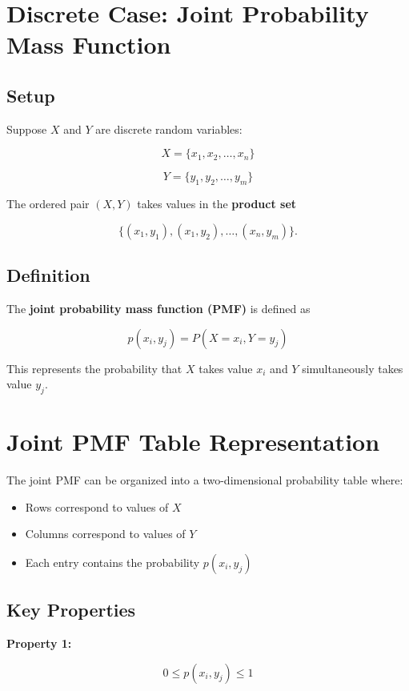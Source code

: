 \documentclass[12pt]{article}
\begin{document}
\section{Discrete Case: Joint Probability Mass Function}

\subsection{Setup}

Suppose $X$ and $Y$ are discrete random variables:

\[
X = \{x_1, x_2, \dots , x_n\}
\]

\[
Y = \{y_1, y_2, \dots , y_m\}
\]

The ordered pair $(X,Y)$ takes values in the \textbf{product set}

\[
\{(x_1,y_1),(x_1,y_2),\dots,(x_n,y_m)\}.
\]

\subsection{Definition}

The \textbf{joint probability mass function (PMF)} is defined as

\[
p(x_i,y_j) = P(X=x_i, Y=y_j)
\]

This represents the probability that $X$ takes value $x_i$ and $Y$ simultaneously takes value $y_j$.

\section{Joint PMF Table Representation}

The joint PMF can be organized into a two-dimensional probability table where:

\begin{itemize}
\item Rows correspond to values of $X$
\item Columns correspond to values of $Y$
\item Each entry contains the probability $p(x_i,y_j)$
\end{itemize}

\subsection{Key Properties}

\textbf{Property 1:}

\[
0 \leq p(x_i,y_j) \leq 1
\]
\end{document}
